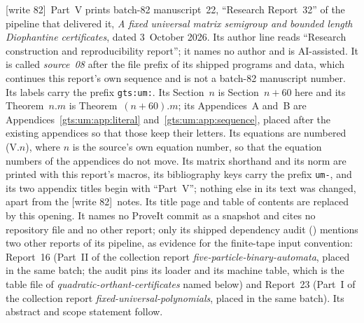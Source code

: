 \documentclass[11pt,letterpaper]{article}
\theoremstyle{definition}
\theoremstyle{remark}
\newcommand{\wtagc}{\textup{[write 82]}}
\begin{document}
\noindent\wtagc\ Part~V prints batch-82 manuscript~22, ``Research Report~32'' of the pipeline that delivered it, \emph{A fixed universal matrix semigroup and bounded length Diophantine certificates}, dated 3~October 2026. Its author line reads ``Research construction and reproducibility report''; it names no author and is AI-assisted. It is called \emph{source~08} after the file prefix of its shipped programs and data, which continues this report's own sequence and is not a batch-82 manuscript number. Its labels carry the prefix \texttt{gts:um:}. Its Section~$n$ is Section~$n+60$ here and its Theorem~$n.m$ is Theorem~$(n+60).m$; its Appendices~A and~B are Appendices~\ref{gts:um:app:literal} and~\ref{gts:um:app:sequence}, placed after the existing appendices so that those keep their letters. Its equations are numbered (V.$n$), where $n$ is the source's own equation number, so that the equation numbers of the appendices do not move. Its matrix shorthand and its norm are printed with this report's macros, its bibliography keys carry the prefix \texttt{um-}, and its two appendix titles begin with ``Part~V''; nothing else in its text was changed, apart from the \wtagc\ notes. Its title page and table of contents are replaced by this opening. It names no ProveIt commit as a snapshot and cites no repository file and no other report; only its shipped dependency audit () mentions two other reports of its pipeline, as evidence for the finite-tape input convention: Report~16 (Part~II of the collection report \emph{five-particle-binary-automata}, placed in the same batch; the audit pins its loader and its machine table, which is the table file of \emph{quadratic-orthant-certificates} named below) and Report~23 (Part~I of the collection report \emph{fixed-universal-polynomials}, placed in the same batch). Its abstract and scope statement follow.
\end{document}
